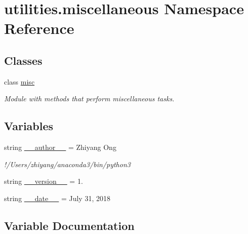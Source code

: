 \hypertarget{namespaceutilities_1_1miscellaneous}{}\section{utilities.\+miscellaneous Namespace Reference}
\label{namespaceutilities_1_1miscellaneous}
\subsection*{Classes}
\begin{DoxyCompactItemize}
\item 
class \hyperlink{classutilities_1_1miscellaneous_1_1misc}{misc}
\begin{DoxyCompactList}\small\item\em Module with methods that perform miscellaneous tasks. \end{DoxyCompactList}\end{DoxyCompactItemize}
\subsection*{Variables}
\begin{DoxyCompactItemize}
\item 
string \hyperlink{namespaceutilities_1_1miscellaneous_a48adfde4ebd796df397b62ffacb0e3e3}{\+\_\+\+\_\+author\+\_\+\+\_\+} = \textquotesingle{}Zhiyang Ong\textquotesingle{}
\begin{DoxyCompactList}\small\item\em !/\+Users/zhiyang/anaconda3/bin/python3 \end{DoxyCompactList}\item 
string \hyperlink{namespaceutilities_1_1miscellaneous_a05f25f703eec056b7c3387b0d5ee06c5}{\+\_\+\+\_\+version\+\_\+\+\_\+} = \textquotesingle{}1.\textquotesingle{}
\item 
string \hyperlink{namespaceutilities_1_1miscellaneous_aa0bfe4910c50f1be3cd69ebad7060965}{\+\_\+\+\_\+date\+\_\+\+\_\+} = \textquotesingle{}July 31, 2018\textquotesingle{}
\end{DoxyCompactItemize}


\subsection{Variable Documentation}
\hypertarget{namespaceutilities_1_1miscellaneous_a48adfde4ebd796df397b62ffacb0e3e3}{}
